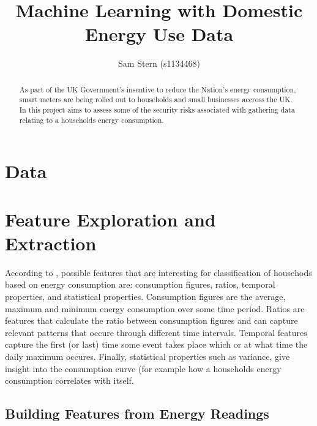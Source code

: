 \documentclass[10pt,a4paper]{report}
\author{Sam Stern (s1134468)}
\title{Machine Learning with Domestic Energy Use Data}
\begin{document}
\maketitle

\begin{abstract}
As part of the UK Government's insentive to reduce the Nation's energy consumption, smart meters are being rolled out to households and small businesses accross the UK. In this project aims to assess some of the security risks associated with gathering data relating to a households energy consumption.
\end{abstract}

\tableofcontents




\chapter{Data}


\chapter{Feature Exploration and Extraction}

According to \cite{Beckel 2}, possible features that are interesting for classification of househods based on energy consumption are: consumption figures, ratios, temporal properties, and statistical properties. Consumption figures are the average, maximum and minimum energy consumption over some time period. Ratios are features that calculate the ratio between consumption figures and can capture relevant patterns that occure through different time intervals. Temporal features capture the first (or last) time some event takes place which or at what time the daily maximum occures. Finally, statistical properties such as variance, give insight into the consumption curve (for example how a households energy consumption correlates with itself.
\section{Building Features from Energy Readings}
\end{document}
